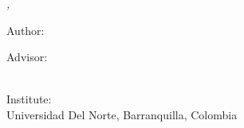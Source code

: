 \hfill
\vfill

\noindent \textit{\myTitle,} {\textcopyright} {\mySubmissionMonth} {\mySubmissionYear}

\bigskip

\noindent Author:\\
{\myFirstName} \textsc{\myLastName}

\medskip

\noindent Advisor:\\
{\myProfTitle} {\myProfFirstName} \textsc{\myProfLastName}\\
{\myOtherProfTitle} {\myOtherProfFirstName} \textsc{\myOtherProfLastName}

\medskip

\noindent Institute:\\
Universidad Del Norte, Barranquilla, Colombia
